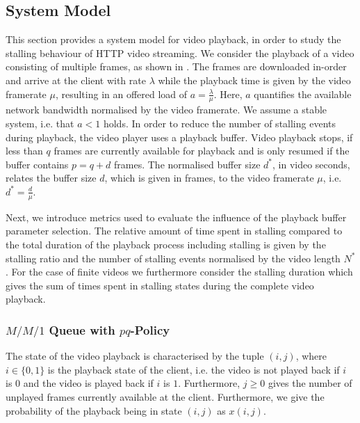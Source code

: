 \subsection{System Model}\label{sec:application:qoe_user_behaviour:system_model}
This section provides a system model for video playback, in order to study the stalling behaviour of \gls{HTTP} video streaming.
We consider the playback of a video consisting of multiple frames, as shown in .
The frames are downloaded in-order and arrive at the client with rate \(\lambda\) while the playback time is given by the video framerate \(\mu\), resulting in an offered load of \(a = \frac{\lambda}{\mu}\). Here, \(a\) quantifies the available network bandwidth normalised by the video framerate. We assume a stable system, i.e. that \(a < 1\) holds.
In order to reduce the number of stalling events during playback, the video player uses a playback buffer.
Video playback stops, if less than \(q\) frames are currently available for playback and is only resumed if the buffer contains \(p = q + d\) frames. 
The normalised buffer size \(d^*\), in video seconds, relates the buffer size \(d\), which is given in frames, to the video framerate \(\mu\), i.e. \(d^*=\frac{d}{\mu}\).

Next, we introduce metrics used to evaluate the influence of the playback buffer parameter selection.
The relative amount of time spent in stalling compared to the total duration of the playback process including stalling is given by the stalling ratio \stallingRatio and the number of stalling events normalised by the video length \(N^*\).
For the case of finite videos we furthermore consider the stalling duration \stallingDuration which gives the sum of times spent in stalling states during the complete video playback. 


\subsubsection*{\(M/M/1\) Queue with \(pq\)-Policy}\label{sec:application:qoe_user_behaviour:system_model:mm1pq}
The state of the video playback is characterised by the tuple \((i, j)\), where \(i \in \{0, 1\}\) is the playback state of the client, i.e. the video is not played back if \(i\) is \(0\) and the video is played back if \(i\) is \(1\).
Furthermore, \(j \geq 0\) gives the number of unplayed frames currently available at the client.
Furthermore, we give the probability of the playback being in state \((i, j)\) as \(x(i, j)\).

